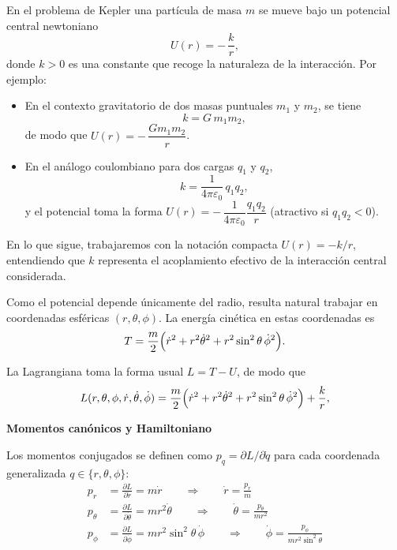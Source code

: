 \documentclass{article}
\begin{document}
En el problema de Kepler una partícula de masa $m$ se mueve bajo un 
potencial central newtoniano
\[
U(r) = -\,\frac{k}{r},
\]
donde $k>0$ es una constante que recoge la naturaleza de la interacción. 
Por ejemplo:
\begin{itemize}
  \item[$\bullet$] En el contexto gravitatorio de dos masas puntuales $m_{1}$ y $m_{2}$,
        se tiene
        \[
          k = G\,m_{1}m_{2},
        \]
        de modo que
        \(
          U(r) = -\,\dfrac{G m_{1} m_{2}}{r}
        \).
  \item[$\bullet$] En el análogo coulombiano para dos cargas $q_{1}$ y $q_{2}$,
        \[
          k = \frac{1}{4\pi\varepsilon_{0}}\,q_{1}q_{2},
        \]
        y el potencial toma la forma
        \(
          U(r) = -\,\dfrac{1}{4\pi\varepsilon_{0}}
                 \dfrac{q_{1}q_{2}}{r}
        \)
        (atractivo si $q_{1}q_{2}<0$).
\end{itemize}

En lo que sigue, trabajaremos con la notación compacta $U(r)=-k/r$, 
entendiendo que $k$ representa el acoplamiento efectivo de la 
interacción central considerada.


Como el potencial depende únicamente del radio, resulta natural trabajar 
en coordenadas esféricas $(r,\theta,\phi)$. La energía cinética en estas 
coordenadas es
\[
T = \frac{m}{2}\Bigl(
      \dot r^{2}
      + r^{2}\dot\theta^{2}
      + r^{2}\sin^{2}\theta\,\dot\phi^{2}
    \Bigr).
\]

La Lagrangiana toma la forma usual $L = T - U$, de modo que
\begin{equation}
L(r,\theta,\phi,\dot r,\dot\theta,\dot\phi)
=
\frac{m}{2}\Bigl(
      \dot r^{2}
      + r^{2}\dot\theta^{2}
      + r^{2}\sin^{2}\theta\,\dot\phi^{2}
    \Bigr)
+ \frac{k}{r},
\label{eq:L-Kepler}
\end{equation}


\textcolor{trueblue}{\textbf{Momentos canónicos y Hamiltoniano}}

Los momentos conjugados se definen como $p_{q} = \partial L/\partial\dot q$ para
cada coordenada generalizada $q\in\{r,\theta,\phi\}$:
\begin{equation}
\begin{split}
p_{r} &= \frac{\partial L}{\partial \dot r}
      = m\dot r
      \qquad\Rightarrow\qquad
      \dot r = \frac{p_{r}}{m} \\[4pt]
p_{\theta} &= \frac{\partial L}{\partial \dot\theta}
           = m r^{2}\dot\theta
           \qquad\Rightarrow\qquad
           \dot\theta = \frac{p_{\theta}}{m r^{2}} \\[4pt]
p_{\phi} &= \frac{\partial L}{\partial \dot\phi}
          = m r^{2}\sin^{2}\theta\,\dot\phi
          \qquad\Rightarrow\qquad
          \dot\phi = \frac{p_{\phi}}{m r^{2}\sin^{2}\theta}
\end{split}
\label{eq:momentos-Kepler}
\end{equation}
\end{document}
